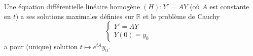 	
	\begin{application}
		Une équation différentielle linéaire homogène $(H) : Y' = AY$ (où $A$ est constante en $t$) a ses solutions maximales définies sur $\mathbb{R}$ et le problème de Cauchy
		\[ \begin{cases} Y' = AY \\ Y(0) = y_0 \end{cases} \]
		a pour (unique) solution $t \mapsto e^{tA} y_0$.
	\end{application}

